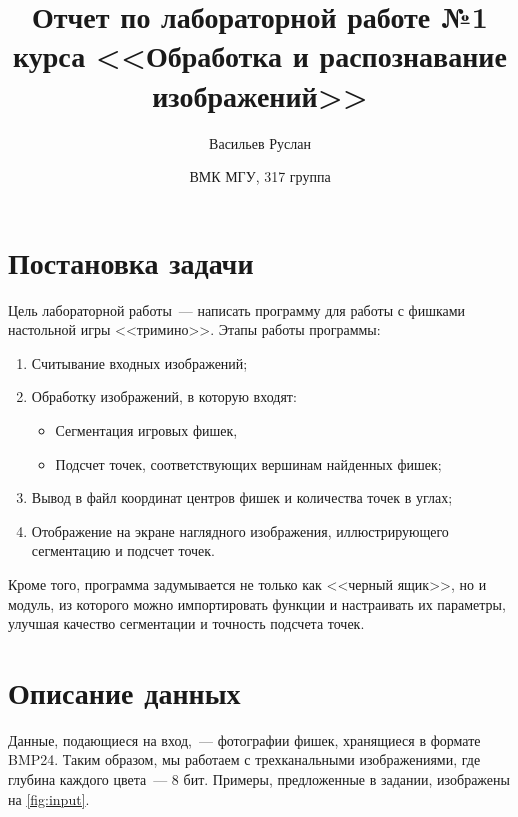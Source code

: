 \documentclass[12pt]{article}
\title{Отчет по лабораторной работе №1\break
\normalsize курса <<Обработка и распознавание изображений>>
}
\author{Васильев Руслан \and{ВМК МГУ, 317 группа}}
\begin{document}
\maketitle
\tableofcontents
\newpage
\setcounter{secnumdepth}{0}

\section{Постановка задачи}
Цель лабораторной работы~--- написать программу для работы с фишками настольной игры <<тримино>>. Этапы работы программы:
\begin{enumerate}
    \item Считывание входных изображений;
    \item Обработку изображений, в которую входят:
    \begin{itemize}
        \item Сегментация игровых фишек,
        \item Подсчет точек, соответствующих вершинам найденных фишек;
    \end{itemize}
    \item Вывод в файл координат центров фишек и количества точек в углах;
    \item Отображение на экране наглядного изображения, иллюстрирующего сегментацию и подсчет точек.
\end{enumerate}

Кроме того, программа задумывается не только как <<черный ящик>>, но и модуль, из которого можно импортировать функции и настраивать их параметры, улучшая качество сегментации и точность подсчета точек.

\section{Описание данных}

Данные, подающиеся на вход,~--- фотографии фишек, хранящиеся в формате BMP24. Таким образом, мы работаем с трехканальными изображениями, где глубина каждого цвета~--- 8 бит. Примеры, предложенные в задании, изображены на \autoref{fig:input}.
\end{document}
